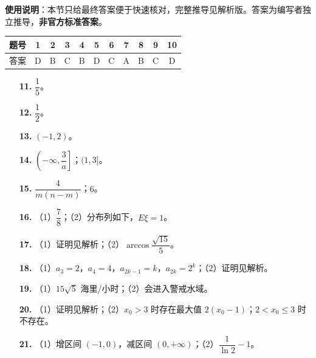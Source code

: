 
\begin{gknotice}
\textbf{使用说明}：本节只给最终答案便于快速核对，完整推导见解析版。答案为编写者独立推导，\textbf{非官方标准答案}。
\end{gknotice}

\begin{center}\begin{tabular}{ccccccccccc}
\toprule
题号 & 1 & 2 & 3 & 4 & 5 & 6 & 7 & 8 & 9 & 10 \\
\midrule
答案 & D & B & C & B & D & C & A & B & C & D \\
\bottomrule
\end{tabular}\end{center}

\begin{itemize}[leftmargin=2.6em]
  \item[\textbf{11.}] $\dfrac15$。
  \item[\textbf{12.}] $\dfrac12$。
  \item[\textbf{13.}] $(-1,2)$。
  \item[\textbf{14.}] $\left(-\infty,\dfrac3a\right]$；$(1,3]$。
  \item[\textbf{15.}] $\dfrac4{m(n-m)}$；$6$。
\end{itemize}

\begin{itemize}[leftmargin=2.6em]
  \item[\textbf{16.}] （1）$\dfrac78$；（2）分布列如下，$E\xi=1$。
  \item[\textbf{17.}] （1）证明见解析；（2）$\arccos\dfrac{\sqrt{15}}5$。
  \item[\textbf{18.}] （1）$a_3=2$，$a_4=4$，$a_{2k-1}=k$，$a_{2k}=2^k$；（2）证明见解析。
  \item[\textbf{19.}] （1）$15\sqrt5$ 海里/小时；（2）会进入警戒水域。
  \item[\textbf{20.}] （1）证明见解析；（2）$x_0>3$ 时存在最大值 $2(x_0-1)$；$2<x_0\leqslant3$ 时不存在。
  \item[\textbf{21.}] （1）增区间 $(-1,0)$，减区间 $(0,+\infty)$；（2）$\dfrac1{\ln2}-1$。
\end{itemize}
